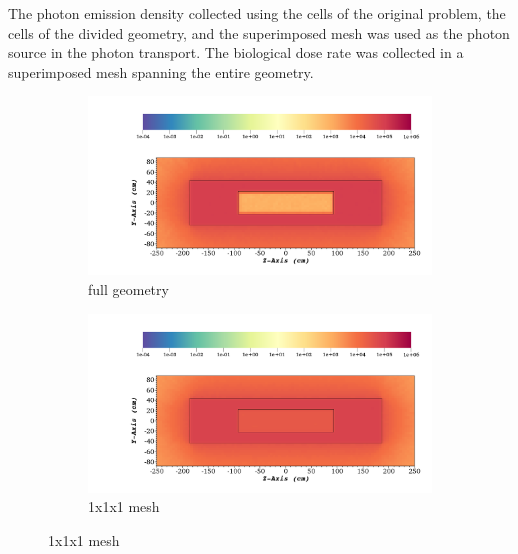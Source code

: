 %
The photon emission density collected using the cells of the original problem,
the cells of the divided geometry, and the superimposed mesh was used as the
photon source in the photon transport.
The biological dose rate was collected in a superimposed mesh spanning the
entire geometry.
%
\begin{figure}[H]
	\begin{subfigure}[t]{0.5\textwidth}
		\includegraphics[width=\linewidth, trim={8cm 2cm 2cm 10cm},clip]{../figs/toy_p2/dose_VPII_original.png}
		\caption{full geometry}
		\label{fig:2dose_orig}
	\end{subfigure}\hfill
	\begin{subfigure}[t]{0.5\textwidth}
		\includegraphics[width=\linewidth, trim={8cm 2cm 2cm 10cm},clip]{../figs/toy_p2/dose_VPII_1x_mesh.png}
		\caption{1x1x1 mesh}
		\label{fig:2dose_1x_mesh}
	\end{subfigure}


\end{figure}
